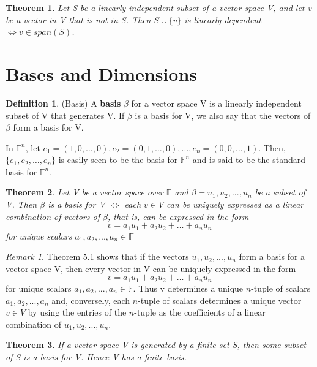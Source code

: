 \documentclass[12pt]{article}
\newtheorem{theorem}{Theorem}[section]
\theoremstyle{definition}
\newtheorem{definition}{Definition}[section]
\theoremstyle{remark}
\newtheorem*{remark}{Remark}
\begin{document}
    \begin{theorem}
        Let S be a linearly independent subset of a vector space V, and let v be a vector in V 
        that is not in S. Then $S \cup \{v\}$ is linearly dependent $\iff v \in span(S)$.
    \end{theorem}

\section{Bases and Dimensions}
    \begin{definition}(Basis)
        A \textbf{basis} $\beta$ for a vector space V is a linearly independent subset of V that generates V. 
        If $\beta$ is a basis for V, we also say that the vectors of $\beta$ form a basis for V.
    \end{definition}
    \begin{example}
        In $\mathbb{F}^n$, let $e_1 = (1,0,\hdots,0),e_2 = (0,1,\hdots,0),..., e_n = (0,0,\hdots,1)$. 
        Then, $\{e_1, e_2, \hdots, e_n\}$ is easily seen to be the basis for $\mathbb{F}^n$ and is 
        said to be the standard basis for $\mathbb{F}^n$.
    \end{example}

    \begin{theorem}
        Let V be a vector space over $\mathbb{F}$ and $\beta = {u_1,u_2,... ,u_n}$ be a subset of V. Then $\beta$ is 
        a basis for V $\iff$ each $v \in V$ can be uniquely expressed as a linear combination of vectors 
        of $\beta$, that is, can be expressed in the form
        \begin{equation*}
            v=a_1u_1+a_2u_2+\hdots+a_nu_n
        \end{equation*}
        for unique scalars $a_1, a_2, ..., a_n \in \mathbb{F}$
    \end{theorem}
    \begin{remark}
        Theorem 5.1 shows that if the vectors ${u_1,u_2,... ,u_n}$ form a basis for a vector space V, 
        then every vector in V can be uniquely expressed in the form
        \begin{equation*}
            v=a_1u_1+a_2u_2+\hdots+a_nu_n
        \end{equation*}
        for unique scalars $a_1, a_2, ..., a_n \in \mathbb{F}$. Thus v determines a unique
        $n$-tuple of scalars $a_1, a_2, ..., a_n$ and, conversely, each $n$-tuple of scalars determines
        a unique vector $v \in V$ by using the entries of the $n$-tuple as the
        coefficients of a linear combination of ${u_1,u_2,... ,u_n}$.
    \end{remark}
    \begin{theorem}
        If a vector space V is generated by a finite set S, then some subset of S is a basis for V. 
        Hence V has a finite basis.
    \end{theorem}
\end{document}
